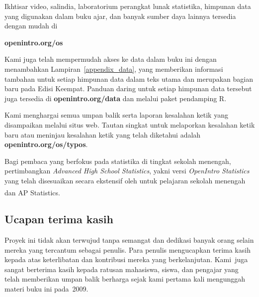 Ikhtisar video, salindia, laboratorium perangkat lunak statistika,
himpunan data yang digunakan dalam buku ajar,
dan banyak sumber daya lainnya tersedia dengan mudah di\\[-5mm]
\begin{center}
    {\color{black}\textbf{openintro.org/os}}
\end{center}
Kami juga telah mempermudah akses ke data dalam buku ini
dengan menambahkan Lampiran~\ref{appendix_data},
yang memberikan informasi tambahan untuk setiap himpunan data
dalam teks utama dan merupakan bagian baru pada Edisi Keempat.
Panduan daring untuk setiap himpunan data tersebut juga tersedia di
    {\color{black}\textbf{openintro.org/data}}
dan melalui
    {paket pendamping R}.
\vspace{3mm}

\noindent%
Kami menghargai semua umpan balik serta laporan kesalahan ketik
yang disampaikan melalui situs web.
Tautan singkat untuk melaporkan kesalahan ketik baru atau meninjau
kesalahan ketik yang telah diketahui adalah
    {\color{black}\textbf{openintro.org/os/typos}}. \vspace{3mm}

\noindent%
Bagi pembaca yang berfokus pada statistika di tingkat sekolah menengah,
pertimbangkan
    {\emph{Advanced High School Statistics}},
yakni versi \emph{OpenIntro Statistics} yang telah
disesuaikan secara ekstensif oleh 
untuk pelajaran sekolah menengah dan
AP\textsuperscript{\textregistered} Statistics.


\subsection*{{\color{oiB}Ucapan terima kasih}}
Proyek ini tidak akan terwujud tanpa semangat dan
dedikasi banyak orang selain mereka yang tercantum sebagai penulis.
Para penulis mengucapkan terima kasih kepada
atas keterlibatan dan kontribusi mereka yang berkelanjutan.
Kami~juga sangat berterima kasih kepada ratusan mahasiswa, siswa,
dan pengajar yang telah memberikan umpan balik berharga
sejak kami pertama kali mengunggah materi buku ini pada~2009. \vspace{3mm}

